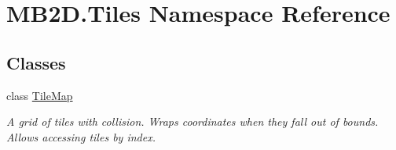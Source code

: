 \hypertarget{namespace_m_b2_d_1_1_tiles}{}\section{M\+B2\+D.\+Tiles Namespace Reference}
\label{namespace_m_b2_d_1_1_tiles}
\subsection*{Classes}
\begin{DoxyCompactItemize}
\item 
class \hyperlink{class_m_b2_d_1_1_tiles_1_1_tile_map}{Tile\+Map}
\begin{DoxyCompactList}\small\item\em A grid of tiles with collision. Wraps coordinates when they fall out of bounds. Allows accessing tiles by index. \end{DoxyCompactList}\end{DoxyCompactItemize}

